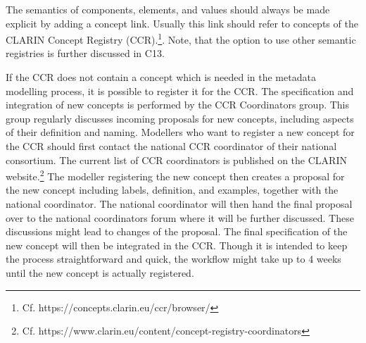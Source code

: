 \begin{workinprogress}
The semantics of components, elements, and values should always be made explicit by adding a concept link. Usually this link should refer to concepts of the CLARIN Concept Registry (CCR).\footnote{Cf. https://concepts.clarin.eu/ccr/browser/}. Note, that the option to use other semantic registries is further discussed in C13.

If the CCR does not contain a concept which is needed in the metadata modelling process, it is possible to register it for the CCR. The specification and integration of new concepts is performed by the CCR Coordinators group. This group regularly discusses incoming proposals for new concepts, including aspects of their definition and naming. Modellers who want to register a new concept for the CCR should first contact the national CCR coordinator of their national consortium. The current list of CCR coordinators is published on the CLARIN website.\footnote{Cf. https://www.clarin.eu/content/concept-registry-coordinators} The modeller registering the new concept then creates a proposal for the new concept including labels, definition, and examples, together with the national coordinator. The national coordinator will then hand the final proposal over to the national coordinators forum where it will be further discussed. These discussions might lead to changes of the proposal. The final specification of the new concept will then be integrated in the CCR. Though it is intended to keep the process straightforward and quick, the workflow might take up to 4 weeks until the new concept is actually registered.
\end{workinprogress}
